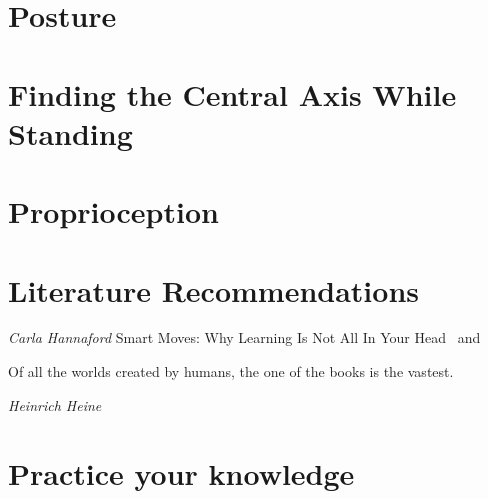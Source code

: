 \documentclass[../main.tex]{subfiles}
\begin{document}


\chapter{Posture}


\newpage

\chapter{Finding the Central Axis While Standing}




\chapter{Proprioception}



\chapter{Literature Recommendations}

\textit{Carla Hannaford} Smart Moves: Why Learning Is Not All In Your Head~\cite{BraingymE} and~\cite{BraingymD}

\epigraph{Of all the worlds created by humans, the one of the books is the vastest.}{\textit{Heinrich Heine}}

\chapter{Practice your knowledge}

\end{document}
